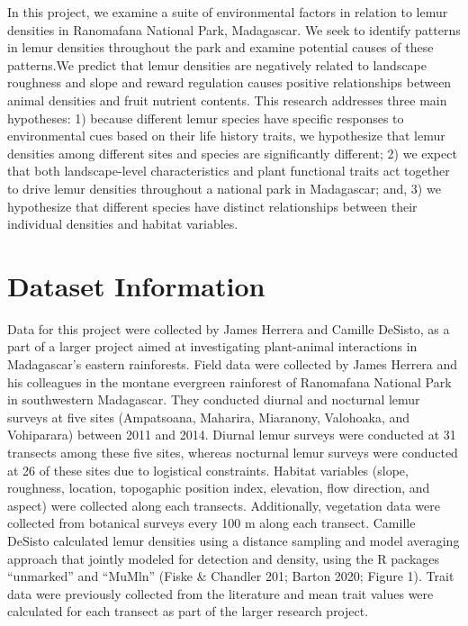 \documentclass[
  12pt,
]{article}
\begin{document}
In this project, we examine a suite of environmental factors in relation
to lemur densities in Ranomafana National Park, Madagascar. We seek to
identify patterns in lemur densities throughout the park and examine
potential causes of these patterns.We predict that lemur densities are
negatively related to landscape roughness and slope and reward
regulation causes positive relationships between animal densities and
fruit nutrient contents. This research addresses three main hypotheses:
1) because different lemur species have specific responses to
environmental cues based on their life history traits, we hypothesize
that lemur densities among different sites and species are significantly
different; 2) we expect that both landscape-level characteristics and
plant functional traits act together to drive lemur densities throughout
a national park in Madagascar; and, 3) we hypothesize that different
species have distinct relationships between their individual densities
and habitat variables.

\newpage

\hypertarget{dataset-information}{%
\section{Dataset Information}\label{dataset-information}}

Data for this project were collected by James Herrera and Camille
DeSisto, as a part of a larger project aimed at investigating
plant-animal interactions in Madagascar's eastern rainforests. Field
data were collected by James Herrera and his colleagues in the montane
evergreen rainforest of Ranomafana National Park in southwestern
Madagascar. They conducted diurnal and nocturnal lemur surveys at five
sites (Ampatsoana, Maharira, Miaranony, Valohoaka, and Vohiparara)
between 2011 and 2014. Diurnal lemur surveys were conducted at 31
transects among these five sites, whereas nocturnal lemur surveys were
conducted at 26 of these sites due to logistical constraints. Habitat
variables (slope, roughness, location, topogaphic position index,
elevation, flow direction, and aspect) were collected along each
transects. Additionally, vegetation data were collected from botanical
surveys every 100 m along each transect. Camille DeSisto calculated
lemur densities using a distance sampling and model averaging approach
that jointly modeled for detection and density, using the R packages
``unmarked'' and ``MuMln'' (Fiske \& Chandler 201; Barton 2020; Figure
1). Trait data were previously collected from the literature and mean
trait values were calculated for each transect as part of the larger
research project.
\end{document}
